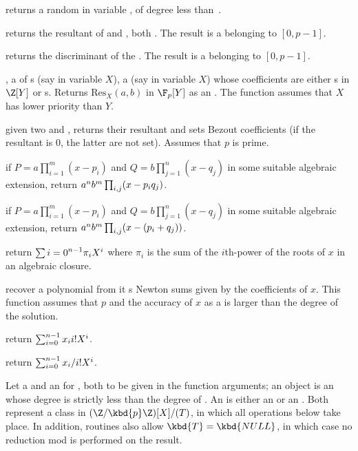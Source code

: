  returns a random 
in variable , of degree less than~.

 returns the resultant
of  and , both . The result is a 
belonging to $[0,p-1]$.

 returns the discriminant
of the  . The result is a  belonging to $[0,p-1]$.

,  a  of
s (say in variable $X$),  a  (say in variable $X$)
whose coefficients are either s in $\Z[Y]$ or s.
Returns $\text{Res}_X(a, b)$ in $\F_p[Y]$ as an . The function
assumes that $X$ has lower priority than $Y$.

given two   and ,
returns their resultant and sets Bezout coefficients (if the resultant is $0$,
the latter are not set). Assumes that $p$ is prime.

 if
$P=a\prod_{i=1}^m(x-p_i)$ and $Q=b\prod_{j=1}^n(x-q_j)$ in some suitable
algebraic extension, return $a^n\*b^m\prod_{i,j}(x-p_i\*q_j)$.

 if
$P=a\prod_{i=1}^m(x-p_i)$ and $Q=b\prod_{j=1}^n(x-q_j)$ in some suitable
algebraic extension, return $a^n\*b^m\prod_{i,j}(x-(p_i+q_j))$.

 return
$\sum{i=0}^{n-1} \pi_i\*X^i$ where $\pi_i$ is the sum of the $i$th-power
of the roots of $x$ in an algebraic closure.

 recover a polynomial from it
s Newton sums given by the coefficients of $x$.
This function assumes that $p$ and the accuracy of $x$ as a  is
larger than the degree of the solution.

 return
$\sum_{i=0}^{n-1} x_i\*i!\*X^i$.

 return
$\sum_{i=0}^{n-1} x_i/{i!}\*X^i$.

 Let  a  and  an
 for , both to be given in the function arguments; an 
object is an  whose degree is strictly less than the degree of
. An  is either an  or an . Both represent
a class in $(\Z/\kbd{p}\Z)[X] / (T)$, in which all operations below take
place. In addition,  routines also allow $\kbd{T} = \kbd{NULL}$, in
which case no reduction mod  is performed on the result.

